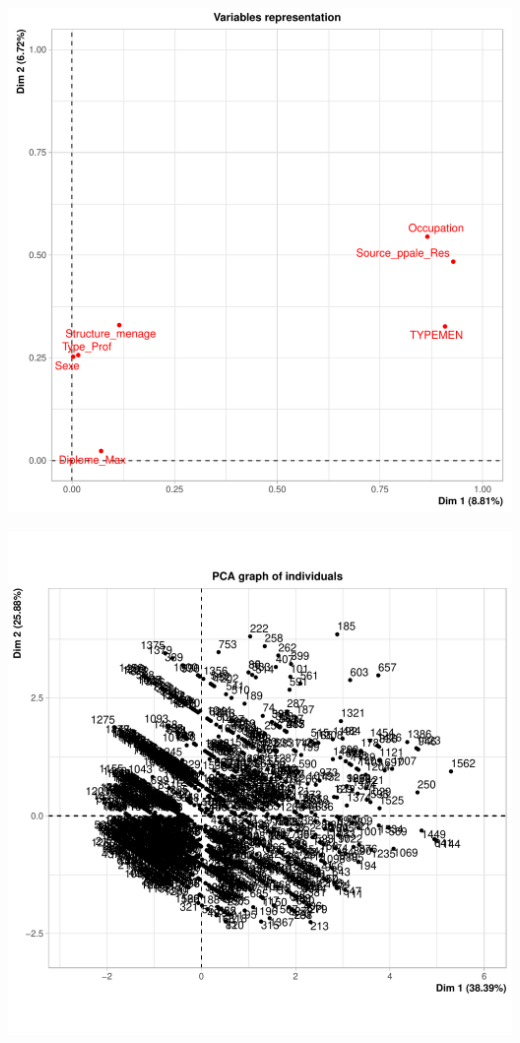 \documentclass[11pt,a4paper, x11names]{article}\usepackage[]{graphicx}\usepackage[]{color}
\makeatletter
\def\maxwidth{ %
  \ifdim\Gin@nat@width>\linewidth
    \linewidth
  \else
    \Gin@nat@width
  \fi
}
\newenvironment{knitrout}{}{} %
\makeatother
\begin{document}
\begin{knitrout}
\includegraphics[width=\maxwidth]{figure/unnamed-chunk-13-3} 

\includegraphics[width=\maxwidth]{figure/unnamed-chunk-13-4} 


\end{knitrout}
\end{document}
